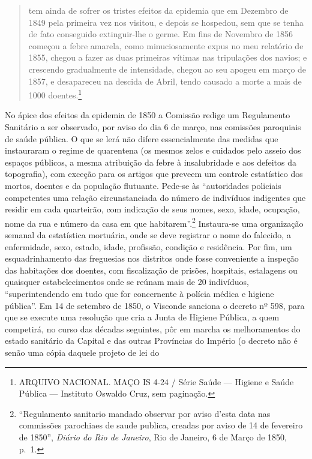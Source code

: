 \begin{quote}
tem ainda de sofrer os tristes efeitos da epidemia que em Dezembro de
1849 pela primeira vez nos visitou, e depois se hospedou, sem que se
tenha de fato conseguido extinguir-lhe o germe. Em fins de Novembro de
1856 começou a febre amarela, como minuciosamente expus no meu relatório
de 1855, chegou a fazer as duas primeiras vítimas nas tripulações dos
navios; e crescendo gradualmente de intensidade, chegou ao seu apogeu em
março de 1857, e desapareceu na descida de Abril, tendo causado a morte
a mais de 1000 doentes.\footnote{ARQUIVO NACIONAL. MAÇO IS 4-24 / Série
  Saúde --- Higiene e Saúde Pública --- Instituto Oswaldo Cruz, sem
  paginação.}
\end{quote}

No ápice dos efeitos da epidemia de 1850 a Comissão redige um
Regulamento Sanitário a ser observado, por aviso do dia 6 de março, nas
comissões paroquiais de saúde pública. O que se lerá não difere
essencialmente das medidas que instauraram o regime de quarentena (os
mesmos zelos e cuidados pelo asseio dos espaços públicos, a mesma
atribuição da febre à insalubridade e aos defeitos da topografia), com
exceção para os artigos que preveem um controle estatístico dos mortos,
doentes e da população flutuante. Pede-se às ``autoridades policiais
competentes uma relação circunstanciada do número de indivíduos
indigentes que residir em cada quarteirão, com indicação de seus nomes,
sexo, idade, ocupação, nome da rua e número da casa em que
habitarem''.\footnote{``Regulamento sanitario mandado observar por aviso
  d'esta data nas commissões parochiaes de saude publica, creadas por
  aviso de 14 de fevereiro de 1850'', \textit{Diário do Rio de Janeiro},
  Rio de Janeiro, 6 de Março de 1850, p.~1.} Instaura-se uma organização
semanal da estatística mortuária, onde se deve registrar o nome do
falecido, a enfermidade, sexo, estado, idade, profissão, condição e
residência. Por fim, um esquadrinhamento das freguesias nos distritos
onde fosse conveniente a inspeção das habitações dos doentes, com
fiscalização de prisões, hospitais, estalagens ou quaisquer
estabelecimentos onde se reúnam mais de 20 indivíduos, ``superintendendo
em tudo que for concernente à polícia médica e higiene pública''. Em 14
de setembro de 1850, o Visconde sanciona o decreto nº 598, para que se
execute uma resolução que cria a Junta de Higiene Pública, a quem
competirá, no curso das décadas seguintes, pôr em marcha os
melhoramentos do estado sanitário da Capital e das outras Províncias do
Império (o decreto não é senão uma cópia daquele projeto de lei do
